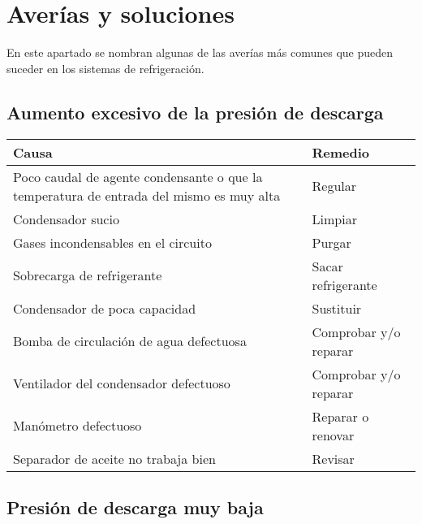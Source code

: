 
\section{Aver\'ias y soluciones}

En este apartado se nombran algunas de las aver\'ias m\'as comunes que pueden suceder en los sistemas de refrigeraci\'on.

\subsection{Aumento excesivo de la presi\'on de descarga}

\begin{table}[H]
    \begin{center}
        \begin{tabular}{p{10cm} p{5cm}}
            \textbf{Causa} & \textbf{Remedio} \\ \hline
            Poco caudal de agente condensante o que la temperatura de entrada del mismo es muy alta & Regular\\
            Condensador sucio & Limpiar\\
            Gases incondensables en el circuito & Purgar\\
            Sobrecarga de refrigerante & Sacar refrigerante\\
            Condensador de poca capacidad & Sustituir\\
            Bomba de circulaci\'on de agua defectuosa & Comprobar y/o reparar\\
            Ventilador del condensador defectuoso & Comprobar y/o reparar\\
            Man\'ometro defectuoso & Reparar o renovar\\
            Separador de aceite no trabaja bien & Revisar\\ \hline
        \end{tabular}
    \end{center}
\end{table}

\subsection{Presi\'on de descarga muy baja}

